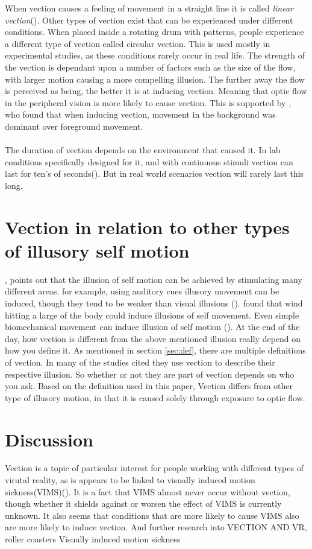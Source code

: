 \documentclass[11pt,a4paper,oneside,table,xcdraw]{article}
\begin{document}
When vection causes a feeling of movement in a straight line it is called \textit{linear vection}(\cite{vectionlinear}). Other types of vection exist that can be experienced under different conditions. When placed inside a rotating drum with patterns, people experience a different type of vection called circular vection. This is used mostly in experimental studies, as these conditions rarely occur in real life.
The strength of the vection is dependant upon a number of factors such as the size of the flow, with larger motion causing a more compelling illusion. The further away the flow is perceived as being, the better it is at inducing vection. Meaning that optic flow in the peripheral vision is more likely to cause vection. This is supported by \cite{vection}, who found that when inducing vection, movement in the background was dominant over foreground movement.\\\\
The duration of vection depends on the environment that caused it. In lab conditions specifically designed for it, and with continuous stimuli vection can last for ten's of seconds(\cite{vection}). But in real world scenarios vection will rarely last this long.  
\section{Vection in relation to other types of illusory self motion}
\cite{challenges}, points out that the illusion of self motion can be achieved by stimulating many different areas. for example, using auditory cues illusory movement can be induced, though they tend to be weaker than visual illusions (\cite{auditory, movement}). \cite{wind} found that wind hitting a large of the body could induce illusions of self movement. Even simple biomechanical movement can induce illusion of self motion (\cite{movement,challenges}). At the end of the day, how vection is different from the above mentioned illusion really depend on how you define it. As mentioned in section \ref{sec:def}, there are multiple definitions of vection. In many of the studies cited they use  vection to describe their respective illusion. So whether or not they are part of vection depends on who you ask. Based on the definition used in this paper, Vection differs from other type of illusory motion, in that it is caused solely through exposure to optic flow. 
\section{Discussion}
Vection is a topic of particular interest for people working with different types of virutal reality, as is appears to be linked to visually induced motion sickness(VIMS)(\cite{vims}). It is a fact that VIMS almost never occur without vection, though whether it shields against or worsen the effect of VIMS is currently unknown. It also seems that conditions that are more likely to cause VIMS also are more likely to induce vection. And further research into 
VECTION AND VR, roller coasters
Visually induced motion sickness



\end{document}
